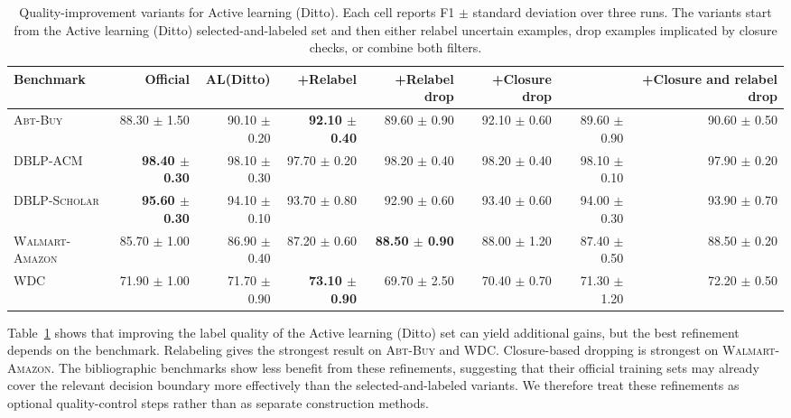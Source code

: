 \begin{table}[t]
  \centering
  \caption{Quality-improvement variants for Active learning (Ditto). Each cell reports F1 $\pm$ standard deviation over three runs. The variants start from the Active learning (Ditto) selected-and-labeled set and then either relabel uncertain examples, drop examples implicated by closure checks, or combine both filters.}
  \label{tab:ditto-refinements}
  \setlength{\tabcolsep}{3.5pt}
  \begin{tabular}{lrrrrrrr}
    \toprule
    Benchmark & Official & AL(Ditto) & +Relabel  & +Relabel drop & +Closure drop & & +Closure and relabel drop   \\
    \midrule
    \textsc{Abt-Buy} & 88.30 $\pm$ 1.50 & 90.10 $\pm$ 0.20 & \textbf{92.10 $\pm$ 0.40} & 89.60 $\pm$ 0.90 & 92.10 $\pm$ 0.60 & 89.60 $\pm$ 0.90 & 90.60 $\pm$ 0.50 \\
    \textsc{DBLP-ACM} & \textbf{98.40 $\pm$ 0.30} & 98.10 $\pm$ 0.30 & 97.70 $\pm$ 0.20 & 98.20 $\pm$ 0.40 & 98.20 $\pm$ 0.40 & 98.10 $\pm$ 0.10 & 97.90 $\pm$ 0.20 \\
    \textsc{DBLP-Scholar} & \textbf{95.60 $\pm$ 0.30} & 94.10 $\pm$ 0.10 & 93.70 $\pm$ 0.80 & 92.90 $\pm$ 0.60 & 93.40 $\pm$ 0.60 & 94.00 $\pm$ 0.30 & 93.90 $\pm$ 0.70 \\
    \textsc{Walmart-Amazon} & 85.70 $\pm$ 1.00 & 86.90 $\pm$ 0.40 & 87.20 $\pm$ 0.60 & \textbf{88.50 $\pm$ 0.90} & 88.00 $\pm$ 1.20 & 87.40 $\pm$ 0.50 & 88.50 $\pm$ 0.20 \\
    \textsc{WDC} & 71.90 $\pm$ 1.00 & 71.70 $\pm$ 0.90 & \textbf{73.10 $\pm$ 0.90} & 69.70 $\pm$ 2.50 & 70.40 $\pm$ 0.70 & 71.30 $\pm$ 1.20 & 72.20 $\pm$ 0.50 \\
    \bottomrule
  \end{tabular}
\end{table}

Table~\ref{tab:ditto-refinements} shows that improving the label quality of the Active learning (Ditto) set can yield additional gains, but the best refinement depends on the benchmark. Relabeling gives the strongest result on \textsc{Abt-Buy} and \textsc{WDC}. Closure-based dropping is strongest on \textsc{Walmart-Amazon}. The bibliographic benchmarks show less benefit from these refinements, suggesting that their official training sets may already cover the relevant decision boundary more effectively than the selected-and-labeled variants. We therefore treat these refinements as optional quality-control steps rather than as separate construction methods.

